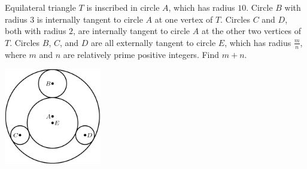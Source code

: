 Equilateral triangle $ T$ is inscribed in circle $ A$, which has radius $ 10$. Circle $ B$ with radius $ 3$ is internally tangent to circle $ A$ at one vertex of $ T$. Circles $ C$ and $ D$, both with radius $ 2$, are internally tangent to circle $ A$ at the other two vertices of $ T$. Circles $ B$, $ C$, and $ D$ are all externally tangent to circle $ E$, which has radius $ \frac {m}{n}$, where $ m$ and $ n$ are relatively prime positive integers. Find $ m + n$.
\begin{center}
\includegraphics[width = 42.400000000000006mm]{img/fig0.png}
\end{center}